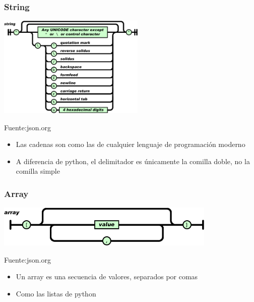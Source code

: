 \documentclass[ucs]{beamer}
\begin{document}

\begin{frame}[fragile]
\frametitle{String}
\begin{center}
  \includegraphics[width=07.0cm]{figs/string}
\end{center}
\begin{flushright}
\begin{tiny}
Fuente:json.org
\end{tiny}
\end{flushright}
\begin{itemize}
\item 
Las cadenas son como las de cualquier lenguaje de programación moderno
\item
A diferencia de python, el delimitador es únicamente la comilla doble,
no la comilla simple
\end{itemize}
\end{frame}

\begin{frame}[fragile]
\frametitle{Array}
\begin{center}
  \includegraphics[width=10.5cm]{figs/array}
\end{center}
\begin{flushright}
\begin{tiny}
Fuente:json.org
\end{tiny}
\end{flushright}
\begin{itemize}
\item 
Un array es una secuencia de valores, separados por comas
\item
Como las listas de python
 
\end{itemize}
\end{frame}
\end{document}
